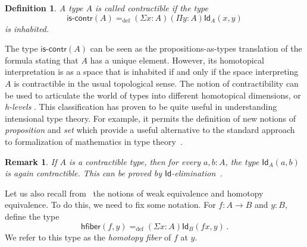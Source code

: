 \documentclass[reqno,10pt,a4paper,oneside]{amsart}
\newcommand{\defeq}{=_{\mathrm{def}}}
\newcommand{\Id}{\mathsf{Id}}
\newcommand{\id}[1]{\Id_{#1}}
\newcommand{\iscontr}{\mathsf{is}\text{-}\mathsf{contr}}
\newcommand{\hfiber}{\mathsf{hfiber}}
\numberwithin{equation}{section}
\theoremstyle{mythm}
\theoremstyle{mydef}
\newtheorem{definition}[theorem]{Definition}
\theoremstyle{myrmk}
\newtheorem{remark}[theorem]{Remark}
\begin{document}
\begin{definition}  A type $A$ is called \emph{contractible} if the  type 
 \begin{equation}
 \label{eq:contractible}
\iscontr(A) \defeq (\Sigma x:A)(\Pi y:A)\id{A}(x,y)
\end{equation}
is inhabited.
\end{definition} 

The type $\iscontr(A)$ can be seen as the propositions-as-types translation
of the formula stating that $A$ has a unique element. However, its homotopical interpretation 
is as a space that is inhabited if and only if the space interpreting $A$ is contractible in the usual
topological sense. The notion of contractibility can be used to articulate the world of types into different homotopical dimensions, or \emph{h-levels} \cite{VoevodskyV:unifc}. This classification has proven to be quite useful in understanding intensional type theory.  
For example, it permits the definition of new notions of \emph{proposition} and \emph{set} which provide a useful alternative to the standard approach to formalization of mathematics in type theory~\cite{VoevodskyV:unifc}.

\begin{remark} \label{thm:idcontrcontr}
If $A$ is a contractible type, then for every $a, b : A$, the type $\id{A}(a,b)$ is again contractible. This can be proved  by $\Id$-elimination~\cite{AwodeyS:indtht}. 
\end{remark}

Let us also recall from~\cite{VoevodskyV:unifc} the notions of weak equivalence and homotopy equivalence. To do this, we need to fix some notation. For $f : A \rightarrow B$
and $y : B$, define the type
\[
 \hfiber(f,y) \defeq (\Sigma x : A) \id{B}(f x, y) \, .
\]
We refer to this type as the \emph{homotopy fiber} of $f$ at $y$. 
\end{document}

